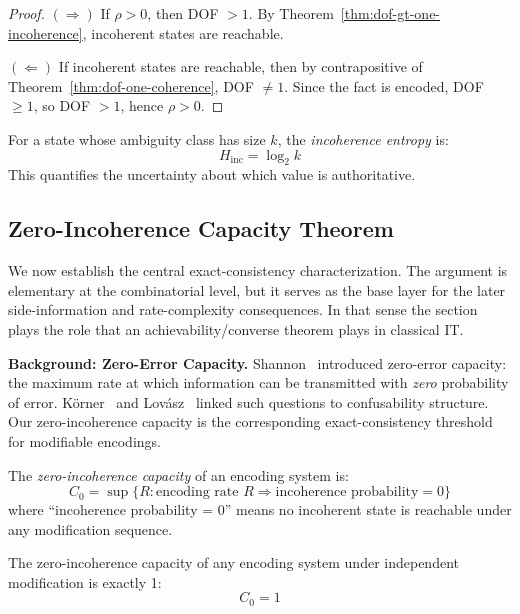 \begin{proof}
$(\Rightarrow)$ If $\rho > 0$, then DOF $> 1$. By Theorem~\ref{thm:dof-gt-one-incoherence}, incoherent states are reachable.

$(\Leftarrow)$ If incoherent states are reachable, then by contrapositive of Theorem~\ref{thm:dof-one-coherence}, DOF $\neq 1$. Since the fact is encoded, DOF $\geq 1$, so DOF $> 1$, hence $\rho > 0$.
\end{proof}

\begin{definition}\label{def:incoherence-entropy}
For a state whose ambiguity class has size $k$, the \emph{incoherence entropy} is:
\[
H_{\text{inc}} = \log_2 k
\]
This quantifies the uncertainty about which value is authoritative.
\end{definition}

\subsection{Zero-Incoherence Capacity Theorem}\label{sec:capacity}

We now establish the central exact-consistency characterization. The argument is elementary at the combinatorial level, but it serves as the base layer for the later side-information and rate-complexity consequences. In that sense the section plays the role that an achievability/converse theorem plays in classical IT.

\textbf{Background: Zero-Error Capacity.} Shannon~\cite{shannon1956zero} introduced zero-error capacity: the maximum rate at which information can be transmitted with \emph{zero} probability of error. Körner~\cite{korner1973graphs} and Lovász~\cite{lovasz1979shannon} linked such questions to confusability structure. Our zero-incoherence capacity is the corresponding exact-consistency threshold for modifiable encodings.

\begin{definition}\label{def:coherence-capacity}
The \emph{zero-incoherence capacity} of an encoding system is:
\[
C_0 = \sup\{R : \text{encoding rate } R \Rightarrow \text{incoherence probability} = 0\}
\]
where ``incoherence probability = 0'' means no incoherent state is reachable under any modification sequence.
\end{definition}

\begin{theorem}\label{thm:coherence-capacity}
The zero-incoherence capacity of any encoding system under independent modification is exactly 1:
\[
C_0 = 1
\]
\end{theorem}

